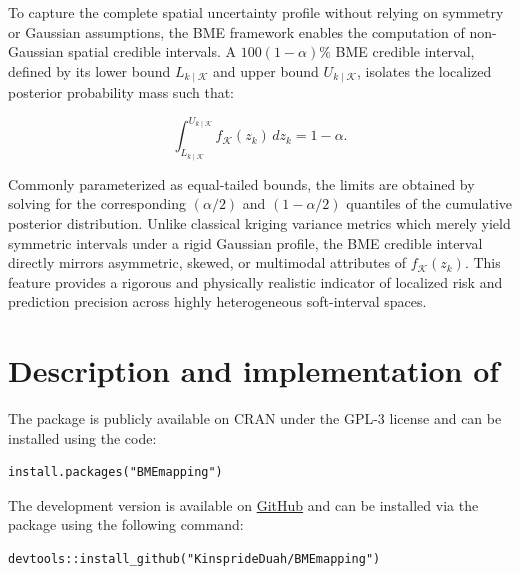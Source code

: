 To capture the complete spatial uncertainty profile without relying on symmetry or Gaussian assumptions, the BME framework enables the computation of non-Gaussian spatial credible intervals. A \(100(1-\alpha)\%\) BME credible interval, defined by its lower bound \(L_{k \mid \mathcal{K}}\) and upper bound \(U_{k \mid \mathcal{K}}\), isolates the localized posterior probability mass such that:

\vspace{-1em}

\begin{equation}
\int_{L_{k \mid \mathcal{K}}}^{U_{k \mid \mathcal{K}}} f_{\mathcal{K}}(z_k) \, dz_k = 1 - \alpha
\label{eq:post-interval}.
\end{equation}

Commonly parameterized as equal-tailed bounds, the limits are obtained by solving for the corresponding \((\alpha/2)\) and \((1 - \alpha/2)\) quantiles of the cumulative posterior distribution. Unlike classical kriging variance metrics which merely yield symmetric intervals under a rigid Gaussian profile, the BME credible interval directly mirrors asymmetric, skewed, or multimodal attributes of \(f_{\mathcal{K}}(z_k)\). This feature provides a rigorous and physically realistic indicator of localized risk and prediction precision across highly heterogeneous soft-interval spaces.

\section{\texorpdfstring{Description and implementation of }{Description and implementation of }}\label{description-and-implementation-of}

The  package is publicly available on CRAN under the GPL-3 license and can be installed using the code:

\begin{verbatim}
install.packages("BMEmapping")
\end{verbatim}

The development version is available on \href{https://github.com/KinsprideDuah/BMEmapping}{GitHub} and can be installed via the  package \citep{wickham2022devtools} using the following command:

\begin{verbatim}
devtools::install_github("KinsprideDuah/BMEmapping")
\end{verbatim}

